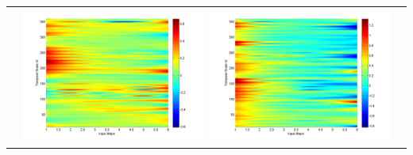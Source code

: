 \documentclass[11pt]{article}
\begin{document}
\begin{table}[H]
{\begin{tabular}{cccc}
&\begin{minipage}{.3\textwidth}\includegraphics[width=\linewidth]{resultgraph/05585000pdiff_former.png}\end{minipage}
&\begin{minipage}{.3\textwidth}\includegraphics[width=\linewidth]{resultgraph/05585000epdiff_former.png}\end{minipage}

\end{tabular}}
\end{table}
\end{document}
